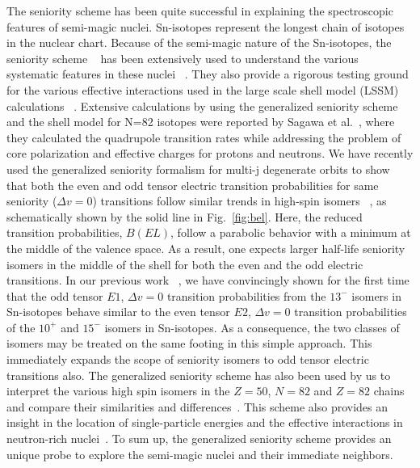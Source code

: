 \documentclass[twocolumn,showpacs,showkeys,preprintnumbers,amsmath,amssymb]{revtex4}
\begin{document}
The seniority scheme has been quite successful in explaining the spectroscopic features of semi-magic nuclei. Sn-isotopes represent the longest chain of isotopes in the nuclear chart. Because of the semi-magic nature of the Sn-isotopes, the seniority scheme ~\cite{racah, talmi, casten} has been extensively used to understand the various systematic features in these nuclei ~\cite{morales, astier}. They also provide a rigorous testing ground for the various effective interactions used in the large scale shell model (LSSM) calculations ~\cite{simpson, maheshwari}. Extensive calculations by using the generalized seniority scheme and the shell model for N=82 isotopes were reported by Sagawa et al.~\cite{sagawa}, where they calculated the quadrupole transition rates while addressing the problem of core polarization and effective charges for protons and neutrons. We have recently used the generalized seniority formalism for multi-j degenerate orbits to show ~\cite{maheshwari1} that both the even and odd tensor electric transition probabilities for same seniority ($\Delta v = 0$) transitions follow similar trends in high-spin isomers ~\cite{atlas}, as schematically shown by the solid line in Fig.~\ref{fig:bel}. Here, the reduced transition probabilities, $B(EL)$, follow a parabolic behavior with a minimum at the middle of the valence space. As a result, one expects larger half-life seniority isomers in the middle of the shell for both the even and the odd electric transitions. In our previous work ~\cite{maheshwari1}, we have convincingly shown for the first time that the odd tensor $E1$, $\Delta v = 0$ transition probabilities from the ${13}^-$ isomers in Sn-isotopes behave similar to the even tensor $E2$, $\Delta v = 0$ transition probabilities of the ${10}^+$ and ${15}^-$ isomers in Sn-isotopes. As a consequence, the two classes of isomers may be treated on the same footing in this simple approach. This immediately expands the scope of seniority isomers to odd tensor electric transitions also. The generalized seniority scheme has also been used by us to interpret the various high spin isomers in the $Z=50$, $N=82$ and $Z=82$ chains and compare their similarities and differences~\cite{china}. This scheme also provides an insight in the location of single-particle energies and the effective interactions in neutron-rich nuclei~\cite{scripta}. To sum up, the generalized seniority scheme provides an unique probe to explore the semi-magic nuclei and their immediate neighbors. 
\end{document}
